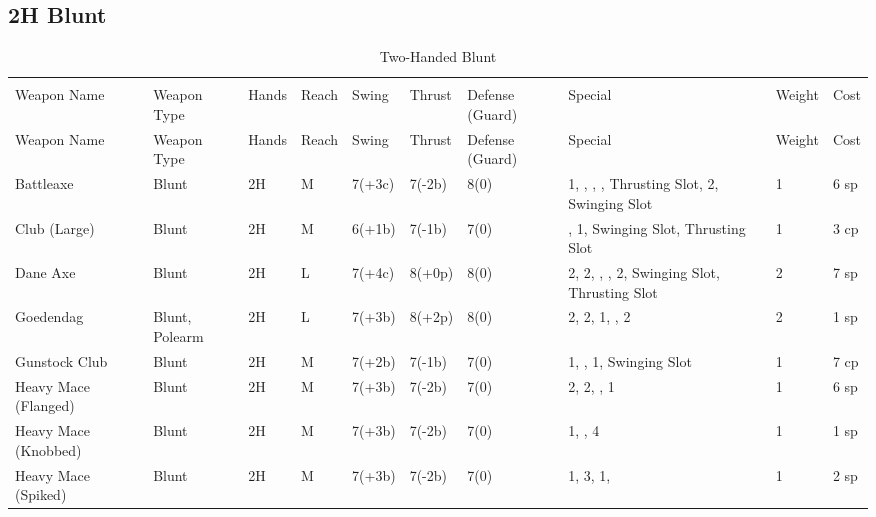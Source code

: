 \documentclass[oneside,11pt,english]{book}
\begin{document}
\subsection{2H Blunt}\vspace{-15pt}
\begin{longtabu} to 1\linewidth {X[2,l]XX[-1,c]X[-1,c]XXX[-1,c]X[2,l]X[-3,c]X[-3,r]}
  \captionsetup{labelformat=blank,textformat=empty}
  \caption{Two-Handed Blunt}\vspace{-15pt}
  \label{tab:2H Blunt}\\
  Weapon Name						&Weapon Type	&Hands&Reach&Swing&Thrust&Defense (Guard)&Special						&Weight	&Cost\\\toprule\endfirsthead
  Weapon Name				&Weapon Type	&Hands	&Reach	&Swing&Thrust&Defense (Guard)&Special																	&Weight	&Cost\\\toprule\endhead
  Battleaxe				&Blunt			&2H		&M		&7(+3c)&7(-2b)&8(0)& 1, , , , Thrusting Slot,  2, Swinging Slot	&1 &6 sp\\
  Club (Large) 			&Blunt			&2H		&M		&6(+1b)&7(-1b)&7(0)&,  1, Swinging Slot, Thrusting Slot								&1 &3 cp\\
  Dane Axe 				&Blunt			&2H		&L		&7(+4c)&8(+0p)&8(0)& 2,  2, , ,  2, Swinging Slot, Thrusting Slot	&2 &7 sp\\
  Goedendag 				&Blunt, Polearm	&2H		&L		&7(+3b)&8(+2p)&8(0)& 2,  2,  1, ,  2							&2 &1 sp\\
  Gunstock Club 			&Blunt			&2H		&M		&7(+2b)&7(-1b)&7(0)& 1, ,  1, Swinging Slot									&1 &7 cp\\
  Heavy Mace (Flanged)	&Blunt			&2H		&M		&7(+3b)&7(-2b)&7(0)& 2,  2, ,  1										&1 &6 sp\\
  Heavy Mace (Knobbed)	&Blunt			&2H		&M		&7(+3b)&7(-2b)&7(0)& 1, ,  4													&1 &1 sp\\
  Heavy Mace (Spiked) 	&Blunt			&2H		&M		&7(+3b)&7(-2b)&7(0)& 1,  3,  1, 										&1 &2 sp\\

\end{longtabu}
\end{document}
